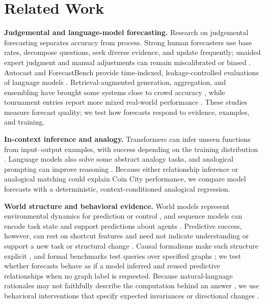 \section{Related Work}
\label{related_work}

\textbf{Judgemental and language-model forecasting.}
Research on judgemental forecasting separates accuracy from process. Strong human
forecasters use base rates, decompose questions, seek diverse evidence, and update
frequently; unaided expert judgment and manual adjustments can remain
miscalibrated or biased
\citep{tetlock2005expert,mellers2014psychological,tetlock2016superforecasting,lawrence2006judgmental}.
Autocast and ForecastBench provide time-indexed, leakage-controlled evaluations of
language models \citep{zou2022forecasting,karger2025forecastbench}. Retrieval-augmented
generation, aggregation, and ensembling have brought some systems close to crowd
accuracy \citep{lewis2020retrieval,halawi2024approaching,schoenegger2024wisdom},
while tournament entries report more mixed real-world performance
\citep{schoenegger2023prediction}. These studies measure forecast
quality; we test how forecasts respond to evidence, examples, and training.

\textbf{In-context inference and analogy.}
Transformers can infer unseen functions from input--output examples, with success
depending on the training distribution
\citep{garg2022what,chan2022data}. Language models also solve some abstract
analogy tasks, and analogical prompting can improve reasoning
\citep{webb2023emergent,yasunaga2024large}. Because either relationship inference or
analogical matching could explain Coin City performance, we compare model forecasts
with a deterministic, context-conditioned analogical regression.

\textbf{World structure and behavioral evidence.}
World models represent environmental dynamics for prediction or control
\citep{ha2018world,lecun2022path}, and sequence models can encode task state and
support predictions about agents \citep{li2023emergent,andreas2022agent}. Predictive
success, however, can rest on shortcut features and need not indicate
understanding or support a new task or structural change
\citep{geirhos2020shortcut,mitchell2023ai,vafa2025foundation}. Causal formalisms
make such structure explicit \citep{pearl2009causality,peters2017elements}, and
formal benchmarks test queries over specified graphs \citep{jin2023cladder}; we test whether forecasts behave as if a model inferred
and reused predictive relationships when no graph label is requested. Because
natural-language rationales may not faithfully describe the computation behind an
answer \citep{jacovi2020towards,turpin2023language}, we use behavioral interventions
that specify expected invariances or directional changes
\citep{ribeiro2020beyond,elazar2021measuring}.
